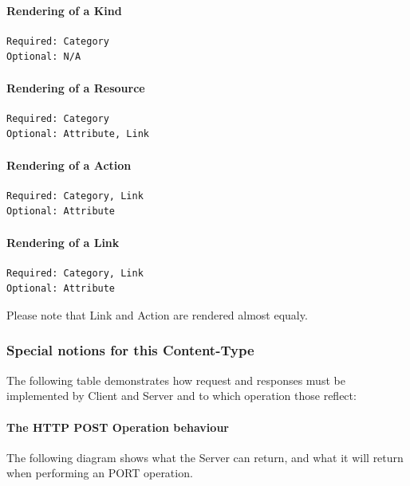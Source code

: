 \documentclass[10pt,a4paper]{article}
\begin{document}
\paragraph{Rendering of a Kind}
\begin{verbatim}
Required: Category
Optional: N/A
\end{verbatim}

\paragraph{Rendering of a Resource}
\begin{verbatim}
Required: Category
Optional: Attribute, Link
\end{verbatim}

\paragraph{Rendering of a Action}
\begin{verbatim}
Required: Category, Link
Optional: Attribute
\end{verbatim}

\paragraph{Rendering of a Link}
\begin{verbatim}
Required: Category, Link
Optional: Attribute
\end{verbatim}
Please note that Link and Action are rendered almost equaly.

\subsubsection{Special notions for this Content-Type}
The following table demonstrates how request and responses must be implemented by Client and Server and to which operation those reflect:

\paragraph{The HTTP POST Operation behaviour}

The following diagram shows what the Server can return, and what it will return when performing an PORT operation.
\end{document}
